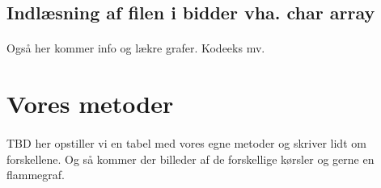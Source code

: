 \documentclass{article}
\begin{document}
\subsection{Indlæsning af filen i bidder vha. char array}
\paragraph{}Også her kommer info og lækre grafer. Kodeeks mv.
\section{Vores metoder}
\paragraph{}
TBD her opstiller vi en tabel med vores egne metoder og skriver lidt om forskellene.
Og så kommer der billeder af de forskellige kørsler og gerne en flammegraf.
\end{document}

